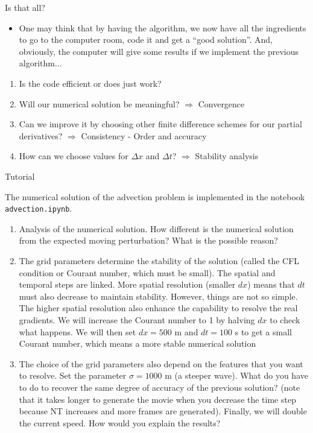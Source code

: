 \documentclass[english,aspectratio=169]{beamer}
\begin{document}
\begin{frame}{Is that all?}

\begin{itemize}
\item One may think that by having the algorithm, we now have all the ingredients
to go to the computer room, code it and get a \textquotedblleft good
solution\textquotedblright . And, obviously, the computer will give
some results if we implement the previous algorithm...
\end{itemize}
\begin{enumerate}
\item Is the code efficient or does just work?
\item Will our numerical solution be meaningful? $\Longrightarrow$ Convergence
\item Can we improve it by choosing other finite difference schemes for
our partial derivatives? $\Longrightarrow$ Consistency - Order and
accuracy
\item How can we choose values for $\Delta x$ and $\Delta t$? $\Longrightarrow$
Stability analysis 
\end{enumerate}
\end{frame}


\begin{frame}{Tutorial}

\small{The numerical solution of the advection problem is implemented
in the notebook \texttt{advection.ipynb}.}
\begin{enumerate}
\item {\tiny{}Analysis of the numerical solution. How different is the numerical
solution from the expected moving perturbation? What is the possible
reason?}{\tiny\par}
\item {\tiny{}The grid parameters determine the stability of the solution (called the CFL condition or Courant number, which must be small). The spatial and temporal steps are linked. More spatial resolution (smaller $dx$) means that $dt$ must also decrease to maintain stability. However, things are
not so simple. The higher spatial resolution also enhance the capability to resolve
the real gradients. We will increase the Courant number to 1 by halving $dx$ to check what happens. We will then set $dx=500$ m and $dt=100$ s to get a small Courant number, which means a more stable numerical solution}
\item {\tiny{}The choice of the grid parameters also depend on the features
that you want to resolve. Set the parameter $\sigma=1000$ m (a steeper
wave). What do you have to do to recover the same degree of accuracy
of the previous solution? (note that it takes longer to generate the
movie when you decrease the time step because NT increases and more
frames are generated). Finally, we will double the current speed. How would you explain the results?}
\end{enumerate}
\end{frame}
\end{document}
